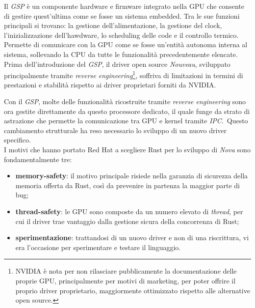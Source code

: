 Il \textit{GSP} è un componente hardware e firmware integrato nella GPU che consente di gestire quest'ultima come se fosse un sistema embedded.
Tra le sue funzioni principali si trovano: la gestione dell'alimentazione, la gestione del clock, l'inizializzazione dell'hawdware, lo scheduling delle code e
il controllo termico. Permette di comunicare con la GPU come se fosse un'entità autonoma interna al sistema, sollevando la CPU da tutte le funzionalità 
precedentemente elencate. \hfill
\vspace{10pt} \\
\noindent Prima dell'introduzione del \textit{GSP}, il driver open source \textit{Nouveau}, sviluppato principalmente tramite \textit{reverse engineering}\footnote{
NVIDIA è nota per non rilasciare pubblicamente la documentazione delle proprie GPU, principalmente per motivi di marketing, per poter 
offrire il proprio driver proprietario, maggiormente ottimizzato rispetto alle alternative open source.
}, soffriva di limitazioni 
in termini di prestazioni e stabilità rispetto ai driver proprietari forniti da NVIDIA.\ 

Con il \textit{GSP}, molte delle funzionalità ricostruite tramite \textit{reverse engineering} sono ora gestite direttamente da 
questo processore dedicato, il quale funge da strato di astrazione che permette la comunicazione tra GPU e kernel tramite \textit{IPC}.\ 
Questo cambiamento strutturale ha reso necessario lo sviluppo di un nuovo driver specifico.\hfill
\vspace{10pt} \\
\noindent I motivi che hanno portato Red Hat a scegliere Rust per lo sviluppo di \textit{Nova} sono fondamentalmente tre:
\begin{itemize}
    \item \textbf{memory-safety}: il motivo principale risiede nella garanzia di sicurezza della memoria offerta da Rust, così da prevenire in partenza la maggior parte di bug;
    \item \textbf{thread-safety}: le GPU sono composte da un numero elevato di \textit{thread}, per cui il driver trae vantaggio dalla gestione sicura della concorrenza di Rust;
    \item \textbf{sperimentazione}: trattandosi di un nuovo driver e non di una riscrittura, vi era l'occasione per sperimentare e testare il linguaggio.
\end{itemize}


